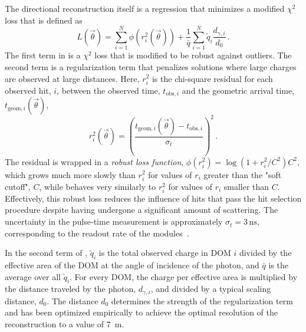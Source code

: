 The directional reconstruction itself is a regression that minimizes a modified $\chi^2$ loss that is defined as
\begin{equation}
L(\vec{\theta})=\sum_{i=1}^{N}\phi(r^2_i(\vec{\theta}))
+
\frac{1}{\bar{q}}\sum_{i=1}^{N}\tilde{q}_i \frac{d_{\gamma,i}}{d_0}\,.\label{eq:chi-square-mod-loss}
\end{equation}
The first term in  is a $\chi^2$ loss that is modified to be robust against outliers. The second term is a regularization term that penalizes solutions where large charges are observed at large distances. Here, $r^2_i$ is the chi-square residual for each observed hit, $i$, between the observed time, $t_{\mathrm{obs}, i}$ and the geometric arrival time, $t_{\mathrm{geom},i}(\vec{\theta})$,
\begin{equation}
r_{i}^{2}(\vec{\theta})=\left(\frac{t_{\mathrm{geom},i}(\vec{\theta})-t_{\mathrm{obs},i}}{\sigma_{t}}\right)^{2}\,.
\end{equation}
The residual is wrapped in a \emph{robust loss function}, $\phi(r_{i}^{2})=\log\left(1+r_{i}^{2}/C^2\right)C^2$, which grows much more slowly than $r_{i}^{2}$ for values of $r_i$ greater than the "soft cutoff", $C$, while behaves very similarly to $r_i^2$ for values of $r_i$ smaller than $C$. Effectively, this robust loss reduces the influence of hits that pass the hit selection procedure despite having undergone a significant amount of scattering. The uncertainty in the pulse-time measurement is approximately $\sigma_{t}=3\,\mathrm{ns}$, corresponding to the readout rate of the modules~\cite{icecube_daq}.

In the second term of , $\tilde{q}_i$ is the total observed charge in DOM $i$ divided by the effective area of the DOM at the angle of incidence of the photon, and $\bar{q}$ is the average over all $\tilde{q}_i$. For every DOM, the charge per effective area is multiplied by the distance traveled by the photon, $d_{\gamma,i}$, and divided by a typical scaling distance, $d_0$. The distance $d_0$ determines the strength of the regularization term and has been optimized empirically to achieve the optimal resolution of the reconstruction to a value of \SI{7}{\meter}.

